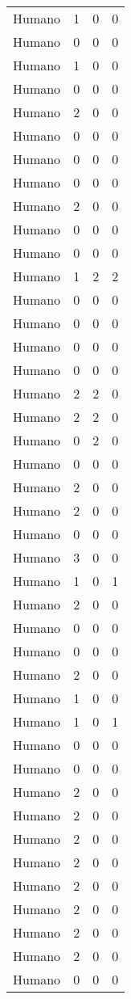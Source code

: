 \begin{footnotesize}
\begin{longtable}{llll}
	Humano & 1 & 0 & 0 \\
	Humano & 0 & 0 & 0 \\
	Humano & 1 & 0 & 0 \\
	Humano & 0 & 0 & 0 \\
	Humano & 2 & 0 & 0 \\
	Humano & 0 & 0 & 0 \\
	Humano & 0 & 0 & 0 \\
	Humano & 0 & 0 & 0 \\
	Humano & 2 & 0 & 0 \\
	Humano & 0 & 0 & 0 \\
	Humano & 0 & 0 & 0 \\
	Humano & 1 & 2 & 2 \\
	Humano & 0 & 0 & 0 \\
	Humano & 0 & 0 & 0 \\
	Humano & 0 & 0 & 0 \\
	Humano & 0 & 0 & 0 \\
	Humano & 2 & 2 & 0 \\
	Humano & 2 & 2 & 0 \\
	Humano & 0 & 2 & 0 \\
	Humano & 0 & 0 & 0 \\
	Humano & 2 & 0 & 0 \\
	Humano & 2 & 0 & 0 \\
	Humano & 0 & 0 & 0 \\
	Humano & 3 & 0 & 0 \\
	Humano & 1 & 0 & 1 \\
	Humano & 2 & 0 & 0 \\
	Humano & 0 & 0 & 0 \\
	Humano & 0 & 0 & 0 \\
	Humano & 2 & 0 & 0 \\
	Humano & 1 & 0 & 0 \\
	Humano & 1 & 0 & 1 \\
	Humano & 0 & 0 & 0 \\
	Humano & 0 & 0 & 0 \\
	Humano & 2 & 0 & 0 \\
	Humano & 2 & 0 & 0 \\
	Humano & 2 & 0 & 0 \\
	Humano & 2 & 0 & 0 \\
	Humano & 2 & 0 & 0 \\
	Humano & 2 & 0 & 0 \\
	Humano & 2 & 0 & 0 \\
	Humano & 2 & 0 & 0 \\
	Humano & 0 & 0 & 0 \\

\end{longtable}
\end{footnotesize}
